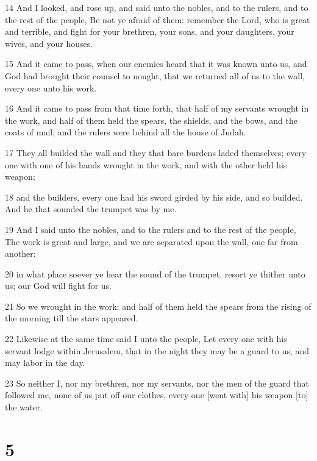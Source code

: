 \par 14 And I looked, and rose up, and said unto the nobles, and to the rulers, and to the rest of the people, Be not ye afraid of them: remember the Lord, who is great and terrible, and fight for your brethren, your sons, and your daughters, your wives, and your houses.
\par 15 And it came to pass, when our enemies heard that it was known unto us, and God had brought their counsel to nought, that we returned all of us to the wall, every one unto his work.
\par 16 And it came to pass from that time forth, that half of my servants wrought in the work, and half of them held the spears, the shields, and the bows, and the coats of mail; and the rulers were behind all the house of Judah.
\par 17 They all builded the wall and they that bare burdens laded themselves; every one with one of his hands wrought in the work, and with the other held his weapon;
\par 18 and the builders, every one had his sword girded by his side, and so builded. And he that sounded the trumpet was by me.
\par 19 And I said unto the nobles, and to the rulers and to the rest of the people, The work is great and large, and we are separated upon the wall, one far from another:
\par 20 in what place soever ye hear the sound of the trumpet, resort ye thither unto us; our God will fight for us.
\par 21 So we wrought in the work: and half of them held the spears from the rising of the morning till the stars appeared.
\par 22 Likewise at the same time said I unto the people, Let every one with his servant lodge within Jerusalem, that in the night they may be a guard to us, and may labor in the day.
\par 23 So neither I, nor my brethren, nor my servants, nor the men of the guard that followed me, none of us put off our clothes, every one [went with] his weapon [to] the water.

\chapter{5}

